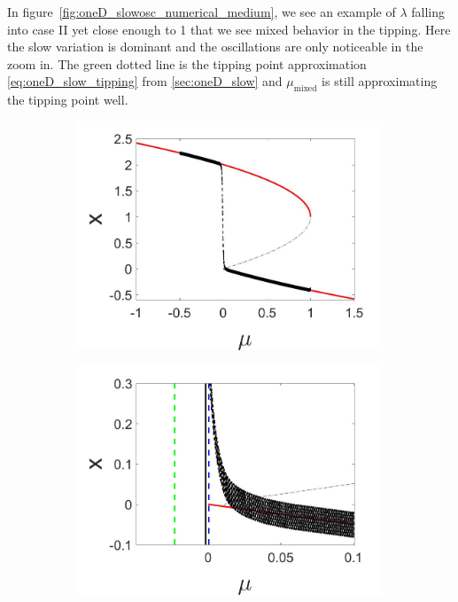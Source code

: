 \indent In figure~\ref{fig:oneD_slowosc_numerical_medium}, we see an example of $\lambda$ falling into case II yet close enough to 1 that we see mixed behavior in the tipping. Here the slow variation is dominant and the oscillations are only noticeable in the zoom in. The green dotted line is the tipping point approximation \eqref{eq:oneD_slow_tipping} from \autoref{sec:oneD_slow} and $\mu_{\text{mixed}}$ is still approximating the tipping point well.

\begin{figure}[H]
\centering
\begin{subfigure}{.5\textwidth}
 \centering
 \includegraphics[width=\linewidth]{oneD/slowosc_bif_diagram_medium.jpg}
 \caption{}
\end{subfigure}%
\begin{subfigure}{.5\textwidth}
 \centering
 \includegraphics[width=\linewidth]{oneD/slowosc_bif_diagram_medium_zoom.jpg}

\end{subfigure}
\end{figure}
